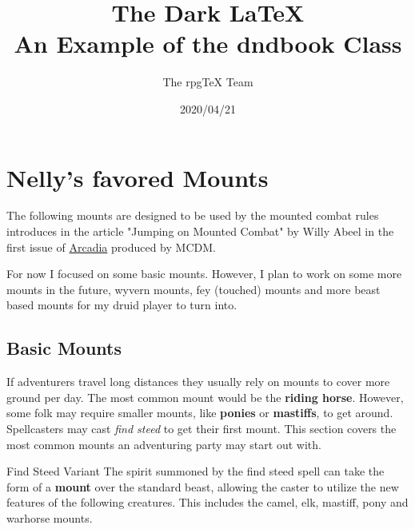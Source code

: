 \documentclass[letterpaper,twocolumn,openany,nodeprecatedcode]{dndbook}
\title{The Dark \LaTeX{} \\
\large An Example of the dndbook Class}
\author{The rpgTeX Team}
\date{2020/04/21}
\begin{document}
\frontmatter



\mainmatter

\chapter{Nelly's favored Mounts}

The following mounts are designed to be used by the mounted combat rules introduces in the article "Jumping on Mounted Combat" by Willy Abeel in the first issue of \href{https://www.youtube.com/watch?v=oid4QMMXjfs}{Arcadia} produced by MCDM.

For now I focused on some basic mounts. However, I plan to work on some more mounts in the future, wyvern mounts, fey (touched) mounts and more beast based mounts for my druid player to turn into.

\section{Basic Mounts}

If adventurers travel long distances they usually rely on mounts to cover more ground per day.
The most common mount would be the \textbf{riding horse}.
However, some folk may require smaller mounts, like \textbf{ponies} or \textbf{mastiffs}, to get around.
Spellcasters may cast \textit{find steed} to get their first mount.
This section covers the most common mounts an adventuring party may start out with.

\begin{DndComment}{Find Steed Variant}
    The spirit summoned by the find steed spell can take the form of a \textbf{mount} over the standard beast, allowing the caster to utilize the new features of the following creatures. This includes the camel, elk, mastiff, pony and warhorse mounts.
\end{DndComment}
\end{document}
